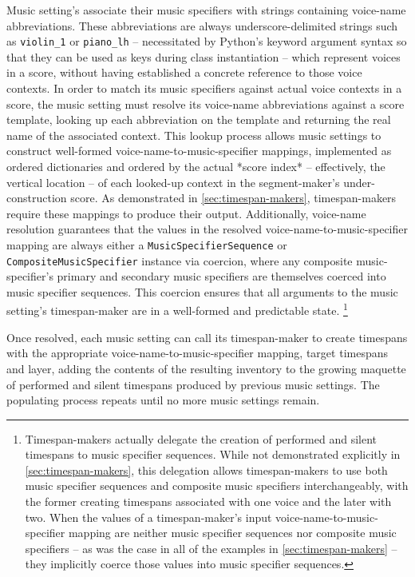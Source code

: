Music setting's associate their music specifiers with strings containing
voice-name abbreviations. These abbreviations are always underscore-delimited
strings such as \texttt{violin\_1} or \texttt{piano\_lh} -- necessitated by
Python's keyword argument syntax so that they can be used as keys during class
instantiation -- which represent voices in a score, without having established
a concrete reference to those voice contexts. In order to match its music
specifiers against actual voice contexts in a score, the music setting must
resolve its voice-name abbreviations against a score template, looking up each
abbreviation on the template and returning the real name of the associated
context. This lookup process allows music settings to construct well-formed
voice-name-to-music-specifier mappings, implemented as ordered dictionaries and
ordered by the actual *score index* -- effectively, the vertical location -- of
each looked-up context in the segment-maker's under-construction score. As
demonstrated in \autoref{sec:timespan-makers}, timespan-makers require these
mappings to produce their output. Additionally, voice-name resolution
guarantees that the values in the resolved voice-name-to-music-specifier
mapping are always either a \texttt{MusicSpecifierSequence} or
\texttt{CompositeMusicSpecifier} instance via coercion, where any composite
music-specifier's primary and secondary music specifiers are themselves coerced
into music specifier sequences. This coercion ensures that all arguments to the
music setting's timespan-maker are in a well-formed and predictable state.
\footnote{Timespan-makers actually delegate the creation of performed and
silent timespans to music specifier sequences. While not demonstrated
explicitly in \autoref{sec:timespan-makers}, this delegation allows
timespan-makers to use both music specifier sequences and composite music
specifiers interchangeably, with the former creating timespans associated with
one voice and the later with two. When the values of a timespan-maker's input
voice-name-to-music-specifier mapping are neither music specifier sequences nor
composite music specifiers -- as was the case in all of the examples in
\autoref{sec:timespan-makers} -- they implicitly coerce those values into music
specifier sequences.}

Once resolved, each music setting can call its timespan-maker to create
timespans with the appropriate voice-name-to-music-specifier mapping, target
timespans and layer, adding the contents of the resulting inventory to the
growing maquette of performed and silent timespans produced by previous music
settings. The populating process repeats until no more music settings remain.

